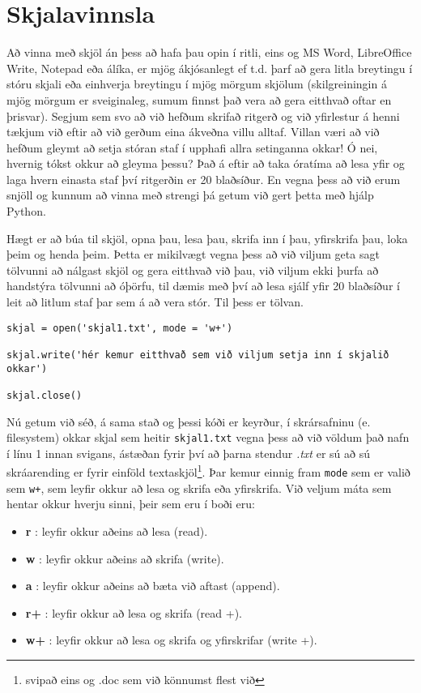 
\chapter{Skjalavinnsla}\label{k:skjalavinnsla}
Að vinna með skjöl án þess að hafa þau opin í ritli, eins og MS Word, LibreOffice Write, Notepad eða álíka, er mjög ákjósanlegt ef t.d. þarf að gera litla breytingu í stóru skjali eða einhverja breytingu í mjög mörgum skjölum (skilgreiningin á mjög mörgum er sveiginaleg, sumum finnst það vera að gera eitthvað oftar en þrisvar).
Segjum sem svo að við hefðum skrifað ritgerð og við yfirlestur á henni tækjum við eftir að við gerðum eina ákveðna villu alltaf.
Villan væri að við hefðum gleymt að setja stóran staf í upphafi allra setinganna okkar!
Ó nei, hvernig tókst okkur að gleyma þessu?
Það á eftir að taka óratíma að lesa yfir og laga hvern einasta staf því ritgerðin er 20 blaðsíður.
En vegna þess að við erum snjöll og kunnum að vinna með strengi þá getum við gert þetta með hjálp Python.

Hægt er að búa til skjöl, opna þau, lesa þau, skrifa inn í þau, yfirskrifa þau, loka þeim og henda þeim.
Þetta er mikilvægt vegna þess að við viljum geta sagt tölvunni að nálgast skjöl og gera eitthvað við þau, við viljum ekki þurfa að handstýra tölvunni að óþörfu, til dæmis með því að lesa sjálf yfir 20 blaðsíður í leit að litlum staf þar sem á að vera stór.
Til þess er tölvan.

\begin{lstlisting}[caption=Hér sjáum við hvernig má búa til skjöl, label=lst:skjalavinnsla-kynning]
skjal = open('skjal1.txt', mode = 'w+') 

skjal.write('hér kemur eitthvað sem við viljum setja inn í skjalið okkar')

skjal.close()
\end{lstlisting}

Nú getum við séð, á sama stað og þessi kóði er keyrður, í skrársafninu (e. filesystem) okkar skjal sem heitir \texttt{skjal1.txt} vegna þess að við völdum það nafn í línu 1 innan svigans, ástæðan fyrir því að þarna stendur \emph{.txt} er sú að sú skráarending er fyrir einföld textaskjöl\footnote{svipað eins og .doc sem við könnumst flest við}.
Þar kemur einnig fram \texttt{mode} sem er valið sem \texttt{w+}, sem leyfir okkur að lesa og skrifa eða yfirskrifa.
Við veljum máta sem hentar okkur hverju sinni, þeir sem eru í boði eru:
\begin{itemize}
	\item \textbf{r} : leyfir okkur aðeins að lesa (read).
	\item \textbf{w} : leyfir okkur aðeins að skrifa (write).
	\item \textbf{a} : leyfir okkur aðeins að bæta við aftast (append).
	\item \textbf{r+} : leyfir okkur að lesa og skrifa (read +).
	\item \textbf{w+} : leyfir okkur að lesa og skrifa og yfirskrifar (write +).
\end{itemize}


